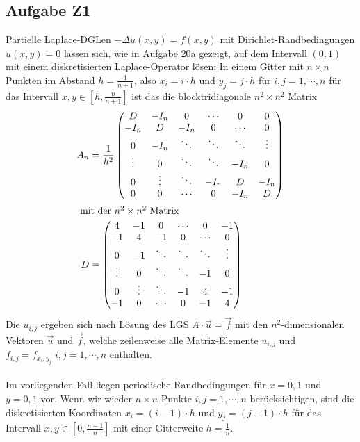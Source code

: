 \subsection*{Aufgabe Z1}
Partielle Laplace-DGLen $-\Delta u(x,y) = f(x,y)$ mit Dirichlet-Randbedingungen
$u(x,y) = 0$ lassen sich, wie in Aufgabe 20a gezeigt, auf dem Intervall $(0,1)$
mit einem diskretisierten Laplace-Operator lösen: In einem Gitter mit
$n \times n$ Punkten im Abstand $h = \frac{1}{n+1}$, also $x_i=i\cdot h$ und
$y_j = j \cdot h$ für $i, j = 1, \cdots, n$ für das Intervall
$x, y \in [h, \frac{n}{n+1}]$
ist das die blocktridiagonale $n^2 \times n^2$ Matrix
\begin{align}
\label{eq-A}
A_n&=\frac{1}{h^2} \begin{pmatrix}
D & -I_n & 0 & \cdots & 0 & 0\\
-I_n & D & -I_n & 0 & \cdots & 0\\
0 & -I_n& \ddots & \ddots & \ddots &\vdots\\
\vdots & 0 & \ddots& \ddots & -I_n & 0\\
0 & \vdots & \ddots & -I_n & D & -I_n\\
0 & 0 & \cdots & 0 & -I_n & D
\end{pmatrix} \\
\intertext{ mit der $n^2 \times n^2$ Matrix }
\label{eq-D}
D &=\begin{pmatrix}
4 & -1 & 0 & \cdots & 0 & -1\\
-1 & 4 & -1 & 0 &\cdots & 0\\
0 & -1 & \ddots & \ddots & \ddots & \vdots\\
\vdots & 0 & \ddots & \ddots &-1 & 0\\
0 & \vdots & \ddots & -1 & 4 & -1\\
-1 & 0 & \cdots & 0 & -1 & 4
\end{pmatrix}
\end{align}
Die $u_{i,j}$ ergeben sich nach Lösung des LGS $A \cdot \vec u = \vec f$
mit den $n^2$-dimensionalen Vektoren $\vec u $ und $\vec f$, welche zeilenweise
alle Matrix-Elemente $u_{i,j}$ und $f_{i, j} = f_{x_i, y_j} \; i, j = 1, \cdots, n$
enthalten.
\paragraph{}
Im vorliegenden Fall liegen periodische Randbedingungen für $x = 0, 1$ und  $y = 0, 1$ vor.
Wenn wir wieder $n \times n$ Punkte  $i, j = 1, \cdots, n$ berücksichtigen,
sind die diskretisierten Koordinaten $x_i=(i-1)\cdot h$ und $y_j = (j-1)\cdot h$
für das Intervall $x, y \in [0, \frac{n-1}{n}]$ mit einer Gitterweite $h = \frac{1}{n}$.

